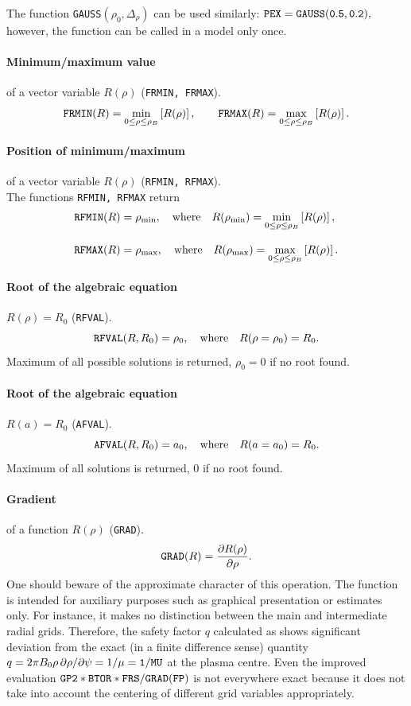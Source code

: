 The function {\tt GAUSS}$(\rho_0,\Delta_\rho)$ can be used similarly:
\marginpar{!!}$\tt PEX = GAUSS(0.5,0.2),$ 
however, the function  can be called in a model only once.

\paragraph{Minimum/maximum value} of a vector variable $R(\rho)$ 
({\tt FRMIN, FRMAX}).
$$
{\tt FRMIN}(R)=\min\limits_{0\leq\rho\leq\rho_B}\left[R(\rho)\right]
,\qquad
{\tt FRMAX}(R)=\max\limits_{0\leq\rho\leq\rho_B}\left[R(\rho)\right]
.$$

\paragraph{Position of minimum/maximum} of a vector variable $R(\rho)$ 
({\tt RFMIN, RFMAX}).\\
The functions {\tt RFMIN, RFMAX} return 
$$
\begin{array}{ll}
{\tt RFMIN}(R)=\rho_{\min}
,\quad\mbox{where}\quad
R(\rho_{\min})=\min\limits_{0\leq\rho\leq\rho_B}\lb[R(\rho)\rb]
,\bigskip\\
{\tt RFMAX}(R)=\rho_{\max}
,\quad\mbox{where}\quad
R(\rho_{\max})=\max\limits_{0\leq\rho\leq\rho_B}\lb[R(\rho)\rb]
.\end{array}
$$

\paragraph{Root of the algebraic equation} $R(\rho)=R_0$ ({\tt RFVAL}).
$$
{\tt RFVAL}(R,R_0)=\rho_0
,\quad\mbox{where}\quad
R(\rho=\rho_0)=R_0
.$$
Maximum of all possible solutions is returned, $\rho_0=0$ if no root
found. 

\paragraph{Root of the algebraic equation} $R(a)=R_0$ ({\tt AFVAL}).
$$
{\tt AFVAL}(R,R_0)=a_0
,\quad\mbox{where}\quad
R(a=a_0)=R_0
.$$
Maximum of all solutions is returned, 0 if no root found.

\paragraph{Gradient} of a function $R(\rho)$ ({\tt GRAD}).
$$
{\tt GRAD}(R)=\displaystyle{\partial R(\rho)\over\partial \rho}
.$$
One should beware of the approximate character of this operation.
The function  is intended for auxiliary purposes such as
graphical presentation or estimates only.  
For instance, it makes no distinction between the main and intermediate
radial grids. 
Therefore, the safety factor $q$ calculated as 
 shows significant deviation from the
exact (in a finite difference sense) quantity 
$q=2\pi B_0\rho\,\partial\rho/\partial\psi=1/\mu=\tt1/MU$ at the
plasma centre. 
Even the improved evaluation $\tt GP2*BTOR*FRS/GRAD(FP)$ is not
everywhere exact because it does not take into account the centering of
different grid variables appropriately. 


